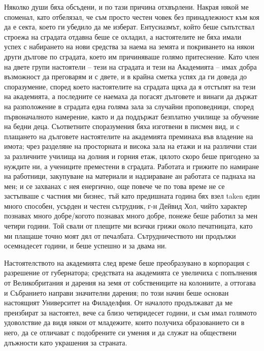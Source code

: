 \documentclass[12pt]{book}
\begin{document}
Няколко души бяха обсъдени, и по тази причина отхвърлени. Накрая някой ме споменал, като отбелязал, че съм просто честен човек без принадлежност към коя да е секта, което ги убедило да ме изберат. Ентусиазмът, който беше съпътствал строежа на сградата отдавна беше се охладил, а настоятелите не бяха имали успех с набирането на нови средства за наема на земята и покриването на някои други дългове по сградата, което им причиняваше голямо притеснение. Като член на двете групи настоятели – тези на сградата и тези на Академията – имах добра възможност да преговарям и с двете, и в крайна сметка успях да ги доведа до споразумение, според което настоятелите на сградата щяха да я отстъпят на тези на академията, а последните се наемаха да погасят дълговете и винаги да държат на разположение в сградата една голяма зала за случайни проповедници, според първоначалното намерение, както и да поддържат безплатно училище за обучение на бедни деца. Съответните споразумения бяха изготвени в писмен вид, и с плащането на дълговете настоятелите на академията преминаха във владение на имота; чрез разделяне на просторната и висока зала на етажи и на различни стаи за различните училища на долния и горния етаж, цялото скоро беше пригодено за нуждите ни, а учениците преместени в сградата. Работата и грижите по намиране на работници, закупуване на материали и надзираване ан работата се паднаха на мен; и се захванах с нея енергично, още повече че по това време не се застъпваше с частния ми бизнес, тъй като предишната година бях взел taken един много способен, усърден и честен сътрудник, г-н Дейвид Хол, чийто характер познавах много добре/когото познавах много добре, понеже беше работил за мен четири години. Той свали от плещите ми всички грижи около печатницата, като ми плащаше точно моят дял от печалбата. Сътрудничеството ни продължи осемнадесет години, и беше успешно и за двама ни.

Настоятелството на академията след време беше преобразувано в корпорация с разрешение от губернатора; средствата на академията се увеличиха с попълнения от Великобритания и дарения на земя от собствениците на колониите, а оттогава и Събранието направи значителни дарения; по този начин беше основан настоящият Университет на Филаделфия. От началото продължават да ме преизбират за настоятел, вече са близо четиридесет години, и съм имал голямото удоволствие да видя някои от младежите, които получиха образованието си в него, да се отличават с подобрените си умения и да служат на обществени длъжности като украшения за страната.
\end{document}
